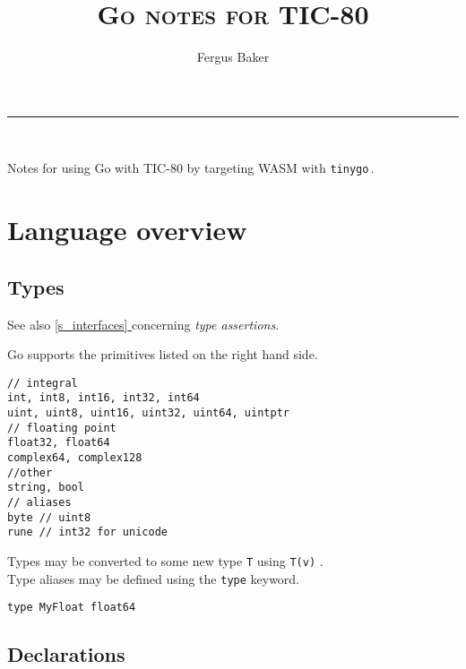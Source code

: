 \documentclass{article}
\title{\scshape Go notes for TIC-80}
\author{Fergus Baker}
\makeatletter
\renewcommand{\maketitle}{
\bgroup\setlength{\parindent}{0em}
  {\scshape\huge\color{headings} \@title}
  \vspace*{6pt}
  {\color{headings}\hrule depth 0.8pt \relax}
  \vspace*{6pt}
  \hspace*{2em}{\@author \hfill \@date\hspace*{2em}}\\[1em]
\egroup
}
\renewenvironment{abstract}
    {}
    {
    \begin{quote}
        \noindent
    \end{quote}
    }
\newcommand{\tinygo}{\texttt{tinygo}\,}
\newcommand{\fullref}[1]{\hyperref[{#1}]{\ref{#1} \nameref{#1}}}
\makeatother
\begin{document}
\maketitle

\begin{abstract}
    Notes for using Go with TIC-80 by targeting WASM with \tinygo.
\end{abstract}

\begingroup
\color{linkcolor}
\tableofcontents
\endgroup
\vspace{2em}



\section{Language overview}

\subsection{Types}

See also \fullref{s_interfaces} concerning \textit{type assertions}.
\\

\begin{paracol}{2}

\noindent Go supports the primitives listed on the right hand side.

\switchcolumn
\begin{lstlisting}
// integral
int, int8, int16, int32, int64
uint, uint8, uint16, uint32, uint64, uintptr
// floating point
float32, float64
complex64, complex128
//other
string, bool
// aliases
byte // uint8
rune // int32 for unicode
\end{lstlisting}

\switchcolumn*
\noindent Types may be converted to some new type \lstinline{T} using \lstinline|T(v)| .
\\
\switchcolumn
\switchcolumn*
\noindent Type aliases may be defined using the \lstinline|type| keyword.

\switchcolumn
\begin{lstlisting}
type MyFloat float64
\end{lstlisting}

\end{paracol}

\subsection{Declarations}
\end{document}
